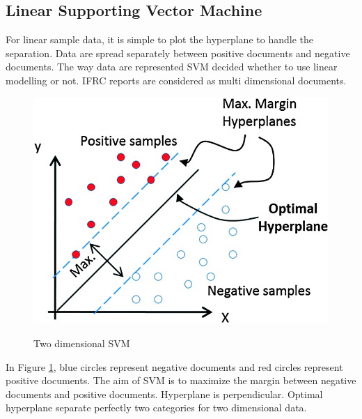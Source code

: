 \subsection{Linear Supporting Vector Machine }
For linear sample data, it is simple to plot the hyperplane to handle the separation.  Data are spread separately between positive documents and negative documents. The way data are represented SVM decided  whether to use linear modelling or not. IFRC reports are considered as multi dimensional documents.
\newpage                                                                                                                                                                                                                                          
\begin{figure}
\caption{Two dimensional SVM \citep{moreira2013finding}}
 \includegraphics[scale=.4]    	          {images/linear.png} \label{linear}
\end{figure}  

In Figure \ref{linear}, blue circles represent negative documents and red circles represent positive documents.
The aim of SVM is to maximize the margin between negative documents and positive documents. Hyperplane is perpendicular. Optimal hyperplane separate perfectly two categories for two dimensional data.
 
